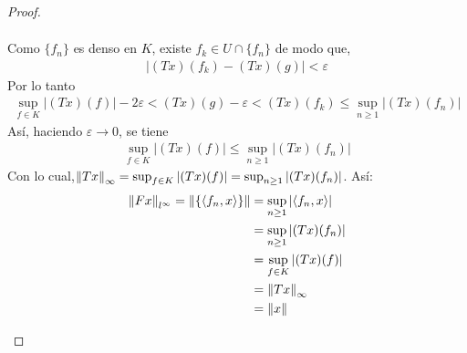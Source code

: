 \begin{proof}
\begin{enumerate}
\begin{align*}
    \end{align*}
    Como $\{f_n\}$ es denso en $K$, existe $f_k \in U\cap \{f_n\}$ de modo que,
    \begin{align*}
        |(Tx)(f_k)-(Tx)(g)|<\varepsilon
    \end{align*}
    Por lo tanto
    \begin{align*}
    \sup_{f\in K}|(Tx)(f)|-2\varepsilon<(Tx)(g)-\varepsilon<(Tx)(f_k)\leq \sup_{n\geq 1}|(Tx)(f_n)|
    \end{align*}
    Así, haciendo $\varepsilon \to 0$, se tiene 
    \begin{align*}
    \sup_{f\in K}|(Tx)(f)|\leq \sup_{n\geq 1}|(Tx)(f_n)| 
    \end{align*}
    Con lo cual,$\left\|Tx\right\|_{\infty}=\sup_{f\in K}|(Tx)(f)|=\sup_{n\geq 1}|(Tx)(f_n)|$. Así:
    \begin{align*}
        \left\|Fx\right\|_{l^{\infty}}=\left\|\{\langle f_n,x\rangle\}\right\|&=\sup_{n\geq 1}|\langle f_n,x\rangle|\\&=\sup_{n\geq1}|(Tx)(f_n)|\\&=\sup_{f\in K}|(Tx)(f)|\\&=\left\|Tx\right\|_{\infty}\\&=\left\|x\right\|
    \end{align*}
    \end{enumerate}

\end{proof}


